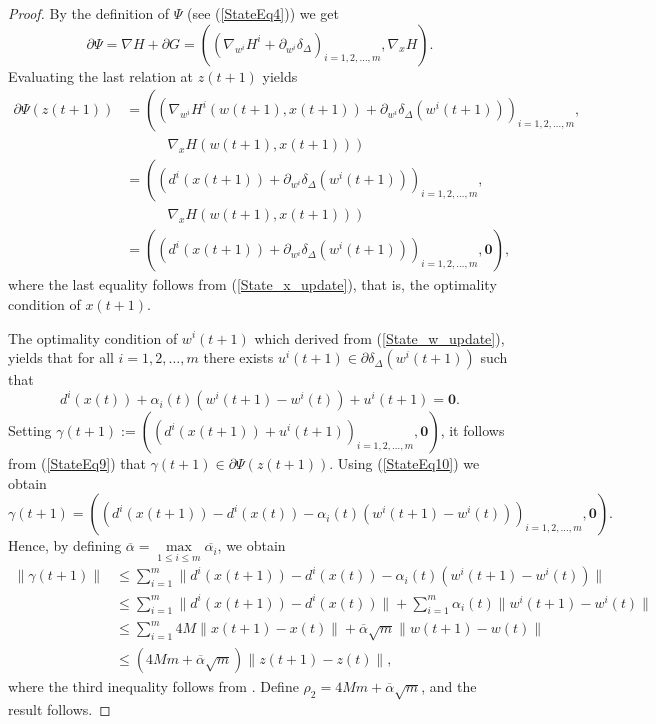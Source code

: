 \begin{proof}
By the definition of $\Psi$ (see (\ref{StateEq4})) we get
\begin{equation*}
	\partial \Psi = \nabla H + \partial G  
= \left( \left( \nabla_{w^i} H^i + \partial_{w^i} \delta_{\Delta} \right)_{i=1,2, \ldots ,m} , \nabla_x H \right) .
\end{equation*}
Evaluating the last relation at $z(t+1)$ yields
\begin{align}
	\partial \Psi(z(t + 1)) &= \left( \left( \nabla_{w^i} H^i(w(t+1),x(t+1)) + \partial_{w^i} \delta_{\Delta}(w^i(t+1)) \right)_{i=1,2, \ldots ,m} , \right. \nonumber \\
	&\quad\quad\quad \left. \nabla_x H(w(t+1),x(t+1)) \right) \nonumber \\
	& = \left( \left( d^i(x(t+1)) + \partial_{w^i} \delta_{\Delta}(w^i(t+1)) \right)_{i=1,2, \ldots ,m} , \right. \nonumber \\
	&\quad\quad\quad \left. \nabla_x H(w(t+1),x(t+1)) \right) \nonumber \\
	& = \left( \left( d^i(x(t+1)) + \partial_{w^i} \delta_{\Delta}(w^i(t+1)) \right)_{i=1,2, \ldots ,m} , \mathbf{0} \right) , \label{StateEq9}
\end{align}
where the last equality follows from (\ref{State_x_update}), that is, the optimality condition of $x(t+1)$.

The optimality condition of $w^i(t+1)$ which derived from (\ref{State_w_update}), yields that for all $i=1, 2, \ldots ,m$ there exists $u^i(t+1) \in \partial \delta_{\Delta}(w^i(t+1))$ such that
\begin{equation}
	d^i(x(t)) + \alpha_i(t) \left( w^i(t+1) - w^i(t) \right) + u^i(t+1) = \mathbf{0} . \label{StateEq10}
\end{equation}
Setting $\gamma(t+1) := \left( \left( d^i(x(t+1)) + u^i(t+1) \right)_{i=1,2, \ldots ,m}, \mathbf{0} \right)$, it follows from (\ref{StateEq9})  that $\gamma(t+1) \in \partial \Psi(z(t+1))$. Using (\ref{StateEq10}) we obtain
\begin{equation*}
	\gamma(t+1) = \left( \left( d^i(x(t+1)) - d^i(x(t)) - \alpha_i(t)(w^i(t+1) - w^i(t)) \right)_{i=1,2, \ldots, m}, \mathbf{0} \right).
\end{equation*}
Hence, by defining $\overline{\alpha} = \max\limits_{1 \leq i \leq m} \overline{\alpha_i}$, we obtain
\begin{align*}
	\| \gamma(t+1) \|
	& \leq \sum\limits_{i=1}^{m} \| d^i(x(t+1)) - d^i(x(t)) - \alpha_i(t) \left( w^i(t+1) - w^i(t) \right) \| \\
	& \leq \sum\limits_{i=1}^{m} \| d^i(x(t+1)) - d^i(x(t)) \| + \sum\limits_{i=1}^{m} \alpha_i(t) \| w^i(t+1) - w^i(t) \| \\
	& \leq \sum\limits_{i=1}^{m} 4M \| x(t+1) - x(t) \| +  \overline{\alpha} \sqrt{m}\|w(t+1) - w(t)\| \\
	& \leq \left( 4Mm + \overline{\alpha}\sqrt{m} \right) \|z(t+1) - z(t)\| , 
\end{align*}
where the third inequality follows from . Define $\rho_2 = 4Mm + \overline{\alpha}\sqrt{m}$, and the result follows.
\end{proof}
